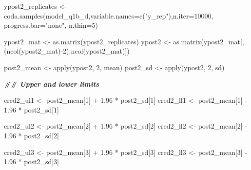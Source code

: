 \documentclass[
]{article}
\newenvironment{Shaded}{\begin{snugshade}}{\end{snugshade}}
\newcommand{\AttributeTok}[1]{\textcolor[rgb]{0.77,0.63,0.00}{#1}}
\newcommand{\DecValTok}[1]{\textcolor[rgb]{0.00,0.00,0.81}{#1}}
\newcommand{\DocumentationTok}[1]{\textcolor[rgb]{0.56,0.35,0.01}{\textbf{\textit{#1}}}}
\newcommand{\FloatTok}[1]{\textcolor[rgb]{0.00,0.00,0.81}{#1}}
\newcommand{\FunctionTok}[1]{\textcolor[rgb]{0.00,0.00,0.00}{#1}}
\newcommand{\NormalTok}[1]{#1}
\newcommand{\OtherTok}[1]{\textcolor[rgb]{0.56,0.35,0.01}{#1}}
\newcommand{\SpecialCharTok}[1]{\textcolor[rgb]{0.00,0.00,0.00}{#1}}
\newcommand{\StringTok}[1]{\textcolor[rgb]{0.31,0.60,0.02}{#1}}
\begin{document}
\begin{Shaded}
\begin{Highlighting}[]
\NormalTok{ypost2\_replicates }\OtherTok{\textless{}{-}} \FunctionTok{coda.samples}\NormalTok{(model\_q1b\_d,}\AttributeTok{variable.names=}\FunctionTok{c}\NormalTok{(}\StringTok{"y\_rep"}\NormalTok{),}\AttributeTok{n.iter=}\DecValTok{10000}\NormalTok{, }\AttributeTok{progress.bar=}\StringTok{"none"}\NormalTok{, }\AttributeTok{n.thin=}\DecValTok{5}\NormalTok{) }

\NormalTok{ypost2\_mat }\OtherTok{\textless{}{-}} \FunctionTok{as.matrix}\NormalTok{(ypost2\_replicates)}
\NormalTok{ypost2 }\OtherTok{\textless{}{-}} \FunctionTok{as.matrix}\NormalTok{(ypost2\_mat[,(}\FunctionTok{ncol}\NormalTok{(ypost2\_mat)}\SpecialCharTok{{-}}\DecValTok{2}\NormalTok{)}\SpecialCharTok{:}\FunctionTok{ncol}\NormalTok{(ypost2\_mat)])}

\NormalTok{post2\_mean }\OtherTok{\textless{}{-}} \FunctionTok{apply}\NormalTok{(ypost2, }\DecValTok{2}\NormalTok{, mean)}
\NormalTok{post2\_sd }\OtherTok{\textless{}{-}} \FunctionTok{apply}\NormalTok{(ypost2, }\DecValTok{2}\NormalTok{, sd)}

\DocumentationTok{\#\# Upper and lower limits}

\NormalTok{cred2\_ul1 }\OtherTok{\textless{}{-}}\NormalTok{ post2\_mean[}\DecValTok{1}\NormalTok{] }\SpecialCharTok{+} \FloatTok{1.96} \SpecialCharTok{*}\NormalTok{ post2\_sd[}\DecValTok{1}\NormalTok{]}
\NormalTok{cred2\_ll1 }\OtherTok{\textless{}{-}}\NormalTok{ post2\_mean[}\DecValTok{1}\NormalTok{] }\SpecialCharTok{{-}} \FloatTok{1.96} \SpecialCharTok{*}\NormalTok{ post2\_sd[}\DecValTok{1}\NormalTok{]}


\NormalTok{cred2\_ul2 }\OtherTok{\textless{}{-}}\NormalTok{ post2\_mean[}\DecValTok{2}\NormalTok{] }\SpecialCharTok{+} \FloatTok{1.96} \SpecialCharTok{*}\NormalTok{ post2\_sd[}\DecValTok{2}\NormalTok{]}
\NormalTok{cred2\_ll2 }\OtherTok{\textless{}{-}}\NormalTok{ post2\_mean[}\DecValTok{2}\NormalTok{] }\SpecialCharTok{{-}} \FloatTok{1.96} \SpecialCharTok{*}\NormalTok{ post2\_sd[}\DecValTok{2}\NormalTok{]}


\NormalTok{cred2\_ul3 }\OtherTok{\textless{}{-}}\NormalTok{ post2\_mean[}\DecValTok{3}\NormalTok{] }\SpecialCharTok{+} \FloatTok{1.96} \SpecialCharTok{*}\NormalTok{ post2\_sd[}\DecValTok{3}\NormalTok{]}
\NormalTok{cred2\_ll3 }\OtherTok{\textless{}{-}}\NormalTok{ post2\_mean[}\DecValTok{3}\NormalTok{] }\SpecialCharTok{{-}} \FloatTok{1.96} \SpecialCharTok{*}\NormalTok{ post2\_sd[}\DecValTok{3}\NormalTok{]}



\end{Highlighting}
\end{Shaded}
\end{document}
